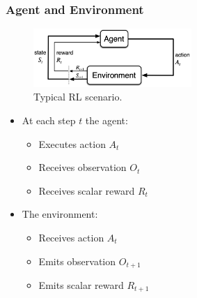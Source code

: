 \documentclass[9pt]{beamer}
\begin{document}
\begin{frame}
\frametitle{Agent and Environment}


\begin{multicols}{2}
	
	\begin{figure}
		\centering
		\includegraphics[width=6cm]{rl-loop.png}
		\caption{Typical RL scenario. \cite{10.5555/3312046}}
		\label{fig:rl-loop}
	\end{figure}
	
	\columnbreak

	\begin{itemize}
		\item At each step $t$ the agent:
		\begin{itemize}
			\item Executes action $A_t$
			\item Receives observation $O_t$
			\item Receives scalar reward $R_t$
		\end{itemize}
	
		\item The environment:
		\begin{itemize}
			\item Receives action $A_t$
			\item Emits observation $O_{t+1}$
			\item Emits scalar reward $R_{t+1}$
		\end{itemize}
	\end{itemize}

\end{multicols}


\end{frame}

\end{document}
